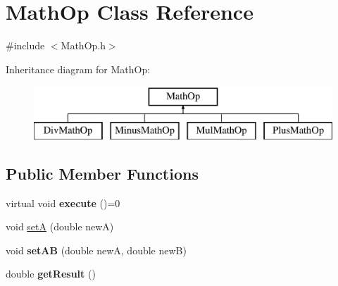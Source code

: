 \hypertarget{class_math_op}{}\section{Math\+Op Class Reference}
\label{class_math_op}


{\ttfamily \#include $<$Math\+Op.\+h$>$}

Inheritance diagram for Math\+Op\+:\begin{figure}[H]
\begin{center}
\leavevmode
\includegraphics[height=2.000000cm]{class_math_op}
\end{center}
\end{figure}
\subsection*{Public Member Functions}
\begin{DoxyCompactItemize}
\item 
\hypertarget{class_math_op_a7eb54cf02054e4c65afd93f0e1f54833}{}virtual void {\bfseries execute} ()=0\label{class_math_op_a7eb54cf02054e4c65afd93f0e1f54833}

\item 
void \hyperlink{class_math_op_aaf00128f671302d984bb32e488229616}{set\+A} (double new\+A)
\item 
\hypertarget{class_math_op_a99e27af1ed722c942d4018b7384b0dff}{}void {\bfseries set\+A\+B} (double new\+A, double new\+B)\label{class_math_op_a99e27af1ed722c942d4018b7384b0dff}

\item 
\hypertarget{class_math_op_a45e51beba01736ca71ccd641eec4b433}{}double {\bfseries get\+Result} ()\label{class_math_op_a45e51beba01736ca71ccd641eec4b433}

\end{DoxyCompactItemize}
